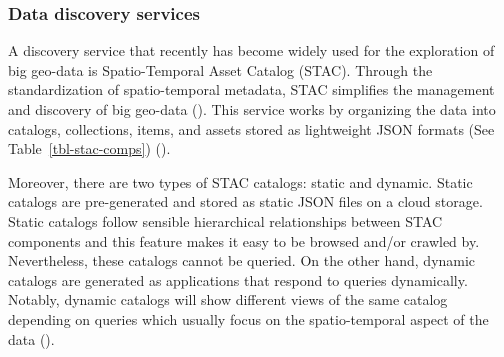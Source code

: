 \documentclass[
  oneside,
  open=any]{scrbook}
\begin{document}
\subsubsection*{Data discovery services}\label{data-discovery-services}

A discovery service that recently has become widely used for the
exploration of big geo-data is Spatio-Temporal Asset Catalog (STAC).
Through the standardization of spatio-temporal metadata, STAC simplifies
the management and discovery of big geo-data
(). This
service works by organizing the data into catalogs, collections, items,
and assets stored as lightweight JSON formats (See
Table~\ref{tbl-stac-comps}) ().

Moreover, there are two types of STAC catalogs: static and dynamic.
Static catalogs are pre-generated and stored as static JSON files on a
cloud storage. Static catalogs follow sensible hierarchical
relationships between STAC components and this feature makes it easy to
be browsed and/or crawled by. Nevertheless, these catalogs cannot be
queried. On the other hand, dynamic catalogs are generated as
applications that respond to queries dynamically. Notably, dynamic
catalogs will show different views of the same catalog depending on
queries which usually focus on the spatio-temporal aspect of the data
().
\end{document}
